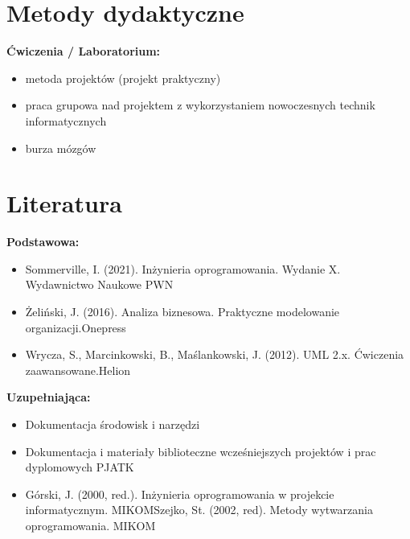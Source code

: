 \documentclass[12pt, a4paper]{article}
\begin{document}
\section{Metody dydaktyczne}

\textbf{Ćwiczenia / Laboratorium:}
\begin{itemize}
  \item metoda projektów (projekt praktyczny)
  \item praca grupowa nad projektem z wykorzystaniem nowoczesnych technik informatycznych
  \item burza mózgów
\end{itemize}
\vspace{4pt}


\section{Literatura}

\textbf{Podstawowa:}
\begin{itemize}
  \item Sommerville, I. (2021). Inżynieria oprogramowania. Wydanie X. Wydawnictwo Naukowe PWN
  \item Żeliński, J. (2016). Analiza biznesowa. Praktyczne modelowanie organizacji.Onepress
  \item Wrycza, S., Marcinkowski, B., Maślankowski, J. (2012). UML 2.x. Ćwiczenia zaawansowane.Helion
\end{itemize}

\textbf{Uzupełniająca:}
\begin{itemize}
  \item Dokumentacja środowisk i narzędzi
  \item Dokumentacja i materiały biblioteczne wcześniejszych projektów i prac dyplomowych PJATK
  \item Górski, J. (2000, red.). Inżynieria oprogramowania w projekcie informatycznym. MIKOMSzejko, St. (2002, red). Metody wytwarzania oprogramowania. MIKOM
\end{itemize}
\end{document}
